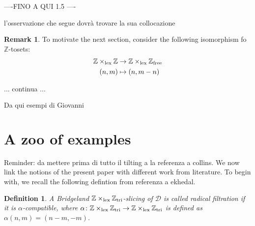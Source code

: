 \documentclass{article}
\newtheorem{defn}[thm]{Definition}
\theoremstyle{definition}
\newtheorem{rem}[thm]{Remark}
\newcommand{\Z}{\mathbb{Z}}
\newcommand{\tee}{\mathfrak{t}}
\newcommand{\lex}{\times_{\textnormal{lex}}}
\newcommand{\triv}{\mathbb{Z}_{\textnormal{tri}}}
\begin{document}
----FINO A QUI 1.5 ----



{\color{red} l'osservazione che segue dovr\`a trovare la sua collocazione

\begin{rem}
To motivate the next section, consider the following isomorphism fo $\Z$-tosets:
  \begin{align*}
     \Z \lex \Z &\to \Z \lex \Z_{\textnormal{free}} \\
   (n,m) & \mapsto (n,m-n)  
  \end{align*}
\end{rem}

... continua ...
}


{\Huge Da qui esempi di Giovanni}
\section{A zoo of examples} 
{\color{red} Reminder: da mettere prima di tutto il tilting a la referenza a collins}. We now link the notions of the present paper with different work from literature. To begin with, we recall the following defintion from {\color{red}referenza a ekhedal}. 

\begin{defn}\label{radical}
A Bridgeland $\Z \lex \triv$-slicing of $\mathscr{D}$ is called \emph{radical filtration} if it is $\alpha$-compatible, where $\alpha \colon \Z \lex \triv \to \Z \lex \triv$ is defined as $\alpha(n,m)=(n-m,-m)$. 
\end{defn}
\end{document}
